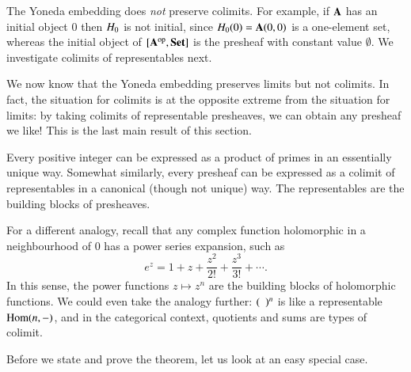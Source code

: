 \begin{warning}
\label{warning:yon-colims}
%
%
The Yoneda embedding does \emph{not} preserve colimits.  For example, if
$\mathbf{A}$ has an initial object $0$ then $H_0$ is not initial, since
$H_0(0) = \mathbf{A}(0, 0)$ is a one-element set, whereas the initial object
of $[\mathbf{A}^{\mathrm{op}},\mathbf{Set}]$ is the presheaf with constant value $\emptyset$.  We
investigate colimits of representables next.
%
%
%
%
\end{warning}


%
%
%
%

We now know that the Yoneda embedding preserves limits but not colimits.
In fact, the situation for colimits is at the opposite extreme from the
situation for limits: by taking colimits of representable presheaves, we
can obtain any presheaf we like!  This is the last main result of this
section.

Every positive integer can be expressed as a product of primes%
%
%
in an essentially unique way.  Somewhat similarly, every presheaf can be
expressed as a colimit of representables in a canonical (though not unique)
way.  The representables are the building blocks of presheaves.

For a different analogy, recall that any complex function holomorphic%
%
%
in a neighbourhood of $0$ has a power%
%
%
series expansion, such as
\[
e^z
=
1 + z + \frac{z^2}{2!} + \frac{z^3}{3!} + \cdots.
\]
In this sense, the power functions $z \mapsto z^n$ are the building blocks
of holomorphic functions.  We could even take the analogy further:
$(\hspace*{.5em})^n$ is like a representable $\operatorname{Hom}(n, -)$, and in the
categorical context, quotients and sums are types of colimit.

Before we state and prove the theorem, let us look at an easy special case.

